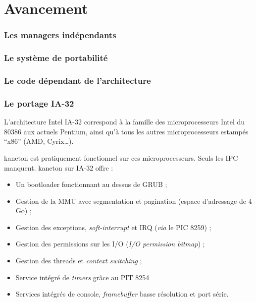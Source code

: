 %
%

\section{Avancement}

\begin{frame}
  \frametitle{Les managers ind\'{e}pendants}

\end{frame}

\begin{frame}
  \frametitle{Le syst\`{e}me de portabilit\'{e}}

\end{frame}

\begin{frame}
  \frametitle{Le code d\'{e}pendant de l'architecture}

\end{frame}


\begin{frame}
  \frametitle{Le portage IA-32}

  L'architecture Intel IA-32 correspond \`{a} la famille des
  microprocesseurs Intel du 80386 aux actuels Pentium, ainsi qu'\`{a} tous
  les autres microprocesseurs estamp\'{e}s ``x86'' (AMD, Cyrix\ldots).

  \-

  kaneton est pratiquement fonctionnel sur ces microprocesseurs. Seuls
  les IPC manquent. kaneton sur IA-32 offre :

  \begin{itemize}
  \item
    Un bootloader fonctionnant au dessus de GRUB ;
  \item
    Gestion de la MMU avec segmentation et pagination (espace d'adressage de 4 Go) ;
  \item
    Gestion des exceptions, \emph{soft-interrupt} et IRQ (\emph{via} le PIC 8259) ;
  \item
    Gestion des permissions sur les I/O (\emph{I/O permission bitmap}) ;
  \item
    Gestion des threads et \emph{context switching} ;
  \item
    Service int\'{e}gr\'{e} de \emph{timers} gr\^{a}ce au PIT 8254
  \item
    Services int\'{e}gr\'{e}s de console, \emph{framebuffer} basse r\'{e}solution et port s\'{e}rie.
  \end{itemize}

\end{frame}

